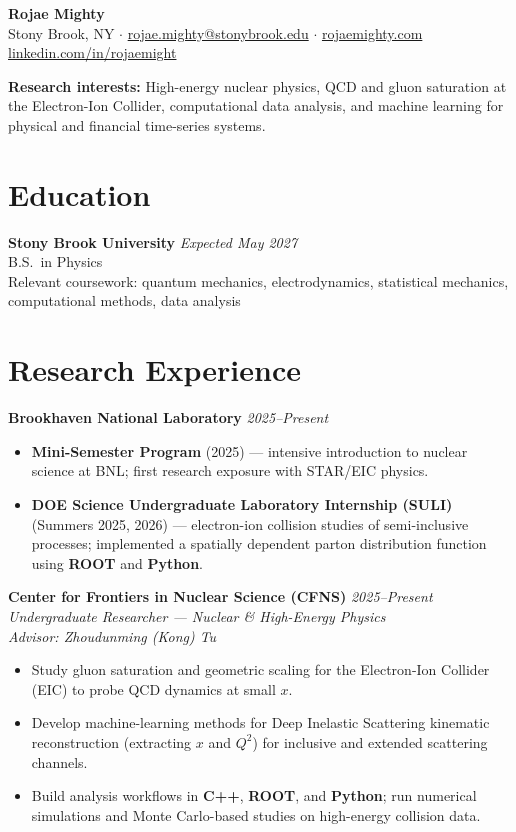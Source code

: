 \documentclass[11pt,letterpaper]{article}
\newcommand{\header}[1]{{\LARGE\bfseries #1}}
\newcommand{\lineitem}[2]{%
  \textbf{#1} \hfill \textit{#2}\\[-2pt]
}
\newcommand{\subheader}[1]{\textit{#1}\\[2pt]}
\newcommand{\cvitem}[1]{\item #1}
\begin{document}
\header{Rojae Mighty}\\[4pt]
Stony Brook, NY \quad$\cdot$\quad
\href{mailto:rojae.mighty@stonybrook.edu}{rojae.mighty@stonybrook.edu} \quad$\cdot$\quad
\href{https://rojaemighty.com}{rojaemighty.com}\\[2pt]
\href{https://www.linkedin.com/in/rojaemight/}{linkedin.com/in/rojaemight}

\vspace{6pt}
\textbf{Research interests:}
High-energy nuclear physics, QCD and gluon saturation at the Electron-Ion Collider, computational data analysis, and machine learning for physical and financial time-series systems.

\section{Education}
\lineitem{Stony Brook University}{Expected May 2027}
B.S.\ in Physics\\
Relevant coursework: quantum mechanics, electrodynamics, statistical mechanics, computational methods, data analysis

\section{Research Experience}

\lineitem{Brookhaven National Laboratory}{2025--Present}
\begin{itemize}[leftmargin=*, nosep, topsep=2pt]
  \cvitem{\textbf{Mini-Semester Program} (2025) --- intensive introduction to nuclear science at BNL; first research exposure with STAR/EIC physics.}
  \cvitem{\textbf{DOE Science Undergraduate Laboratory Internship (SULI)} (Summers 2025, 2026) --- electron-ion collision studies of semi-inclusive processes; implemented a spatially dependent parton distribution function using \textbf{ROOT} and \textbf{Python}.}
\end{itemize}

\lineitem{Center for Frontiers in Nuclear Science (CFNS)}{2025--Present}
\subheader{Undergraduate Researcher --- Nuclear \& High-Energy Physics}
\subheader{Advisor: Zhoudunming (Kong) Tu}
\begin{itemize}[leftmargin=*, nosep, topsep=2pt]
  \cvitem{Study gluon saturation and geometric scaling for the Electron-Ion Collider (EIC) to probe QCD dynamics at small $x$.}
  \cvitem{Develop machine-learning methods for Deep Inelastic Scattering kinematic reconstruction (extracting $x$ and $Q^2$) for inclusive and extended scattering channels.}
  \cvitem{Build analysis workflows in \textbf{C++}, \textbf{ROOT}, and \textbf{Python}; run numerical simulations and Monte Carlo-based studies on high-energy collision data.}
\end{itemize}
\end{document}

